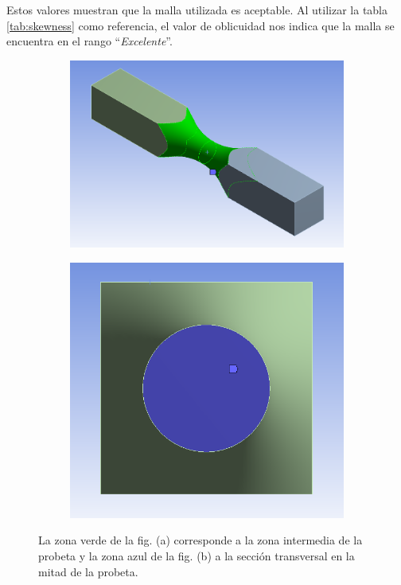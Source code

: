 Estos valores muestran que la malla utilizada es aceptable. Al utilizar la tabla \ref{tab:skewness} como referencia, el valor de oblicuidad nos indica que la malla se encuentra en el rango ``\textit{Excelente}''.

\begin{figure}[h]
\centering
	\begin{subfigure}{0.5\linewidth}
		\centering
		\includegraphics[width=0.82\linewidth]{Imagenes/zona_media.PNG}
		\caption{}\label{fig:zona_media}
	\end{subfigure}%
	\begin{subfigure}{0.5\linewidth}
		\centering
		\includegraphics[width=0.6\linewidth]{Imagenes/cara_corte.PNG}
		\caption{}\label{fig:cara_corte}
	\end{subfigure}%
\caption{La zona verde de la fig. (a) corresponde a la zona intermedia de la probeta y la zona azul de la fig. (b) a la sección transversal en la mitad de la probeta.}
\label{fig:zona_probeta}
\end{figure}

